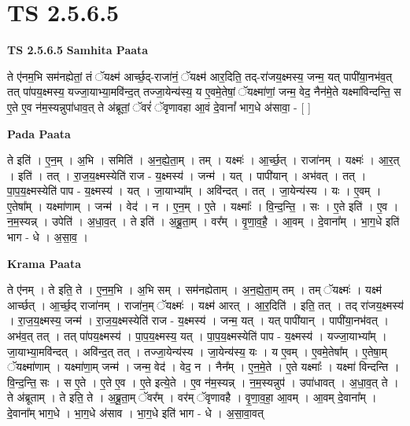 \documentclass[17pt]{extarticle}
\begin{document}
\section{ TS 2.5.6.5 }

\textbf{TS 2.5.6.5 } \newline
\textbf{Samhita Paata} \newline

ते ए॑नम॒भि सम॑नह्येतां॒ तं ॅयक्ष्म॑ आर्च्छ॒द्-राजा॑नं॒ ॅयक्ष्म॑ आर॒दिति॒ तद्-रा॑जय॒क्ष्मस्य॒ जन्म॒ यत् पापी॑या॒नभ॑व॒त् तत् पा॑पय॒क्ष्मस्य॒ यज्जा॒याभ्या॒मवि॑न्द॒त् तज्जा॒येन्य॑स्य॒ य ए॒वमे॒तेषां॒ ॅयक्ष्मा॑णां॒ जन्म॒ वेद॒ नैन॑मे॒ते यक्ष्मा॑विन्दन्ति॒ स ए॒ते ए॒व न॑म॒स्यन्नुपा॑धाव॒त् ते अ॑ब्रूतां॒ ॅवरं॑ ॅवृणावहा आ॒वं दे॒वानां᳚ भाग॒धे अ॑सावा॒ - [  ] \newline

\textbf{Pada Paata} \newline

ते इति॑ । ए॒न॒म् । अ॒भि । समिति॑ । अ॒न॒ह्ये॒ता॒म् । तम् । यक्ष्मः॑ । आ॒र्च्छ॒त् । राजा॑नम् । यक्ष्मः॑ । आ॒र॒त् । इति॑ । तत् । रा॒ज॒य॒क्ष्मस्येति॑ राज - य॒क्ष्मस्य॑ । जन्म॑ । यत् । पापी॑यान् । अभ॑वत् । तत् । पा॒प॒य॒क्ष्मस्येति॑ पाप - य॒क्ष्मस्य॑ । यत् । जा॒याभ्या᳚म् । अवि॑न्दत् । तत् । जा॒येन्य॑स्य । यः । ए॒वम् । ए॒तेषा᳚म् । यक्ष्मा॑णाम् । जन्म॑ । वेद॑ । न । ए॒न॒म् । ए॒ते । यक्ष्माः᳚ । वि॒न्द॒न्ति॒ । सः । ए॒ते इति॑ । ए॒व । न॒म॒स्यन्न् । उपेति॑ । अ॒धा॒व॒त् । ते इति॑ । अ॒ब्रू॒ता॒म् । वर᳚म् । वृ॒णा॒व॒है॒ । आ॒वम् । दे॒वाना᳚म् । भा॒ग॒धे इति॑ भाग - धे । अ॒सा॒व॒ ।  \newline


\textbf{Krama Paata} \newline

ते ए॑नम् । ते इति॒ ते । ए॒न॒म॒भि । अ॒भि सम् । सम॑नह्येताम् । अ॒न॒ह्ये॒ता॒म् तम् । तम् ॅयक्ष्मः॑ । यक्ष्म॑ आर्च्छत् । आ॒र्च्छ॒द् राजा॑नम् । राजा॑न॒म् ॅयक्ष्मः॑ । यक्ष्म॑ आरत् । आ॒र॒दिति॑ । इति॒ तत् । तद् रा॑जय॒क्ष्मस्य॑ । रा॒ज॒य॒क्ष्मस्य॒ जन्म॑ । रा॒ज॒य॒क्ष्मस्येति॑ राज - य॒क्ष्मस्य॑ । जन्म॒ यत् । यत् पापी॑यान् । पापी॑या॒नभ॑वत् । अभ॑व॒त् तत् । तत् पा॑पय॒क्ष्मस्य॑ । पा॒प॒य॒क्ष्मस्य॒ यत् । पा॒प॒य॒क्ष्मस्येति॑ पाप - य॒क्ष्मस्य॑ । यज्जा॒याभ्या᳚म् । जा॒याभ्या॒मवि॑न्दत् । अवि॑न्द॒त् तत् । तज्जा॒येन्य॑स्य । जा॒येन्य॑स्य॒ यः । य ए॒वम् । ए॒वमे॒तेषा᳚म् । ए॒तेषा॒म् ॅयक्ष्मा॑णाम् । यक्ष्मा॑णा॒म् जन्म॑ । जन्म॒ वेद॑ । वेद॒ न । नैन᳚म् । ए॒न॒मे॒ते । ए॒ते यक्ष्माः᳚ । यक्ष्मा॑ विन्दन्ति । वि॒न्द॒न्ति॒ सः । स ए॒ते । ए॒ते ए॒व । ए॒ते इत्ये॒ते । ए॒व न॑म॒स्यन्न् । न॒म॒स्यन्नुप॑ । उपा॑धावत् । अ॒धा॒व॒त् ते । ते अ॑ब्रूताम् । ते इति॒ ते । अ॒ब्रू॒ता॒म् ॅवर᳚म् । वर॑म् ॅवृणावहै । वृ॒णा॒व॒हा॒ आ॒वम् । आ॒वम् दे॒वाना᳚म् । दे॒वाना᳚म् भाग॒धे । भा॒ग॒धे अ॑साव । भा॒ग॒धे इति॑ भाग - धे । अ॒सा॒वा॒वत् \newline
\end{document}
